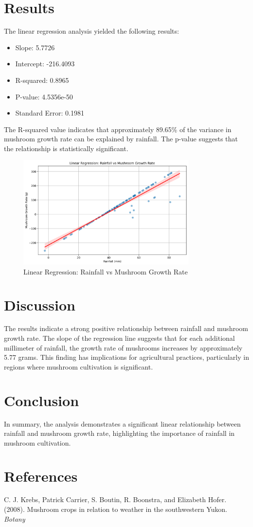 \documentclass{article}
\begin{document}
\section*{Results}
The linear regression analysis yielded the following results:
\begin{itemize}
    \item Slope: 5.7726
    \item Intercept: -216.4093
    \item R-squared: 0.8965
    \item P-value: 4.5356e-50
    \item Standard Error: 0.1981
\end{itemize}
The R-squared value indicates that approximately 89.65\% of the variance in mushroom growth rate can be explained by rainfall. The p-value suggests that the relationship is statistically significant.

\begin{figure}[h]
    \centering
    \includegraphics[width=0.8\textwidth]{adjusted_fake_rain_mushrooms_with_high_noise.png}
    \caption{Linear Regression: Rainfall vs Mushroom Growth Rate}
    \label{fig:regression}
\end{figure}

\section*{Discussion}
The results indicate a strong positive relationship between rainfall and mushroom growth rate. The slope of the regression line suggests that for each additional millimeter of rainfall, the growth rate of mushrooms increases by approximately 5.77 grams. This finding has implications for agricultural practices, particularly in regions where mushroom cultivation is significant.

\section*{Conclusion}
In summary, the analysis demonstrates a significant linear relationship between rainfall and mushroom growth rate, highlighting the importance of rainfall in mushroom cultivation.

\section*{References}
C. J. Krebs, Patrick Carrier, S. Boutin, R. Boonstra, and Elizabeth Hofer. (2008). Mushroom crops in relation to weather in the southwestern Yukon. \textit{Botany}
 
\end{document}
